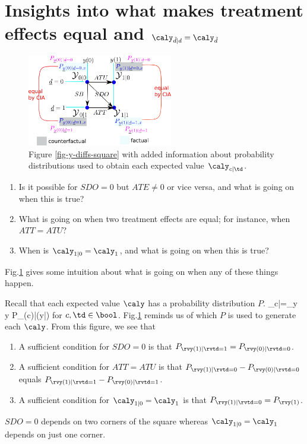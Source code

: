 \section{Insights into
what makes treatment effects equal and
$\caly_{\tilde{d}|d}=\caly_{\tilde{d}}$}
\label{sec-td-ignored}

\begin{figure}[h!]
\centering
\includegraphics[width=2.5in]
{pot-out/y-diffs-square-probs.png}
\caption{Figure \ref{fig-y-diffs-square}
with added information
about  probability distributions
used to obtain each expected value
 $\caly_{c|\td }$.}
\label{fig-y-diffs-square-probs}
\end{figure}


\begin{enumerate}
\item
Is it
possible for $SDO=0$ but $ATE\neq 0$
or vice versa, and
what is going on when this is true?
\item
What is going on when two treatment effects
are equal; for instance, when $ATT=ATU$?
\item
When is $\caly_{1|0}=\caly_{1}$,
and what is going on when this is  true?
\end{enumerate}
Fig.\ref{fig-y-diffs-square-probs}
gives some
intuition
about what is
going on when any of these
things happen.

Recall that
each expected value $\caly$ has a probability
distribution $P$.
\beq
\caly_{c|\td }=\sum_{y} y P_{\rvy(c)|\rvtd}(y|\td)
\eeq
for $c, \td\in \bool$.
Fig.\ref{fig-y-diffs-square-probs}
reminds us of which $P$
is used to generate each $\caly$.
From this figure, we see that

\begin{enumerate}
\item
A sufficient
condition for $SDO=0$
is that
$P_{\rvy(1)|\rvtd=1}
=
P_{\rvy(0)|\rvtd=0}$.

\item
A sufficient condition for
$ATT=ATU$
is that
$P_{\rvy(1)|\rvtd=0}
-
P_{\rvy(0)|\rvtd=0}$
equals
$P_{\rvy(1)|\rvtd=1}
-
P_{\rvy(0)|\rvtd=1}$.
\item
A sufficient condition for $\caly_{1|0}=\caly_{1}$
is that
$P_{\rvy(1)|\rvtd=0}=
P_{\rvy(1)}$.
\end{enumerate}
$SDO=0$
depends on two corners
of the square
whereas  $\caly_{1|0}=\caly_{1}$
depends on just one corner.

